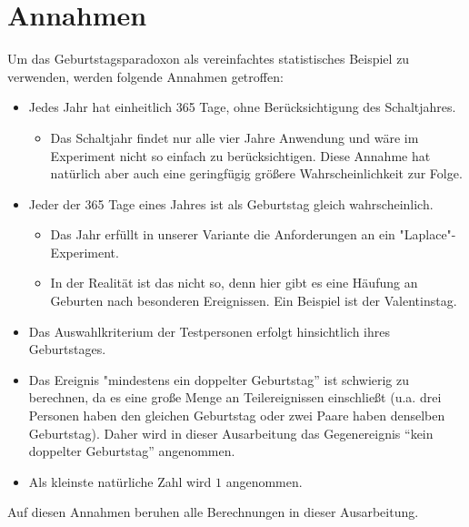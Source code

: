 \documentclass[11pt]{article}
\begin{document}
    \section{Annahmen}

    Um das Geburtstagsparadoxon als vereinfachtes statistisches Beispiel zu verwenden, werden folgende Annahmen getroffen:

    \begin{itemize}
        \item Jedes Jahr hat einheitlich 365 Tage, ohne Berücksichtigung des Schaltjahres.
        \begin{itemize}
            \item Das Schaltjahr findet nur alle vier Jahre Anwendung und wäre im Experiment nicht so einfach zu berücksichtigen. Diese Annahme hat natürlich aber auch eine geringfügig größere Wahrscheinlichkeit zur Folge.
        \end{itemize}
    \end{itemize}

    \begin{itemize}
        \item Jeder der 365 Tage eines Jahres ist als Geburtstag gleich wahrscheinlich.

        \begin{itemize}
            \item Das Jahr erfüllt in unserer Variante die Anforderungen an ein "Laplace"-Experiment.
        \end{itemize}

        \begin{itemize}
            \item In der Realität ist das nicht so, denn hier gibt es eine Häufung an Geburten nach besonderen Ereignissen. Ein Beispiel ist der Valentinstag.
        \end{itemize}

    \end{itemize}

    \begin{itemize}
        \item Das Auswahlkriterium der Testpersonen erfolgt hinsichtlich ihres Geburtstages.
    \end{itemize}

    \begin{itemize}
        \item Das Ereignis "mindestens ein doppelter Geburtstag” ist schwierig zu berechnen, da es eine große Menge an Teilereignissen einschließt (u.a. drei Personen haben den gleichen Geburtstag oder zwei Paare haben denselben Geburtstag). Daher wird in dieser Ausarbeitung das Gegenereignis “kein doppelter Geburtstag” angenommen.
    \end{itemize}

    \begin{itemize}
        \item Als kleinste natürliche Zahl wird \(1\) angenommen.
    \end{itemize}

Auf diesen Annahmen beruhen alle Berechnungen in dieser Ausarbeitung.
\end{document}
